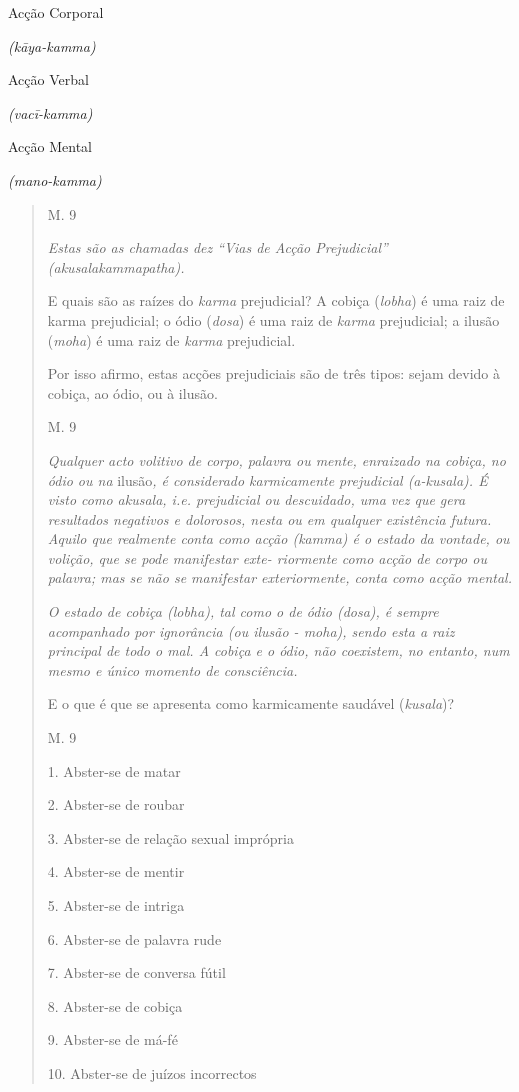 Acção Corporal

\emph{(kāya-kamma)}

Acção Verbal

\emph{(vacī-kamma)}

Acção Mental

\emph{(mano-kamma)}

\begin{quote}
M. 9

\emph{Estas são as chamadas dez ``Vias de Acção Prejudicial''} \emph{(akusalakammapatha).}

E quais são as raízes do \emph{karma} prejudicial? A cobiça (\emph{lobha}) é uma raiz de karma prejudicial; o ódio (\emph{dosa}) é uma raiz de \emph{karma} prejudicial; a ilusão (\emph{moha}) é uma raiz de \emph{karma} prejudicial.

Por isso afirmo, estas acções prejudiciais são de três tipos: sejam devido à cobiça, ao ódio, ou à ilusão.

M. 9

\emph{Qualquer acto volitivo de corpo, palavra ou mente, enraizado na cobiça, no ódio ou na} ilusão\emph{, é considerado karmicamente prejudicial (a-kusala). É visto como akusala, i.e. prejudicial ou descuidado, uma vez que gera resultados negativos e dolorosos, nesta ou em qualquer existência futura. Aquilo que realmente conta como acção (kamma) é o estado da vontade, ou volição, que se pode manifestar exte- riormente como acção de corpo ou palavra; mas se não se manifestar exteriormente, conta como acção mental.}

\emph{O estado de cobiça (lobha), tal como o de ódio (dosa), é sempre acompanhado por ignorância (ou ilusão - moha), sendo esta a raiz principal de todo o mal. A cobiça e o ódio, não coexistem, no entanto, num mesmo e único momento de consciência.}

E o que é que se apresenta como karmicamente saudável (\emph{kusala})?

M. 9

1. Abster-se de matar

2. Abster-se de roubar

3. Abster-se de relação sexual imprópria

4. Abster-se de mentir

5. Abster-se de intriga

6. Abster-se de palavra rude

7. Abster-se de conversa fútil

8. Abster-se de cobiça

9. Abster-se de má-fé

10. Abster-se de juízos incorrectos
\end{quote}

